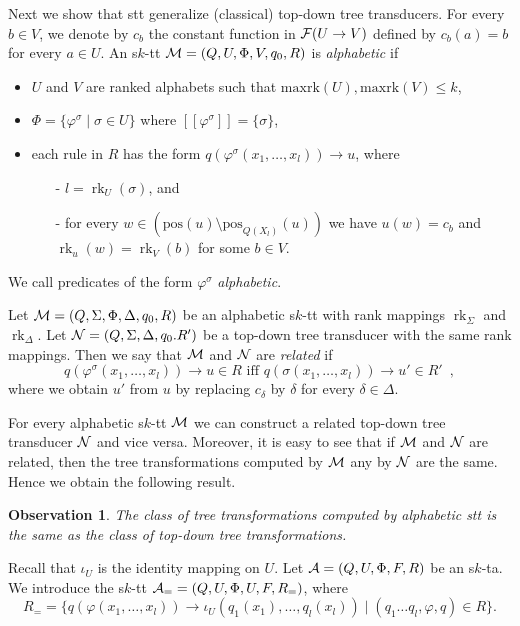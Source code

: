 \documentclass[10pt]{scrartcl}
\newtheorem{ob}[df]{Observation}
\newcommand{\seml}{[\![}
\newcommand{\semr}{]\!]}
\newcommand{\pos}{\mathrm{pos}}
\newcommand{\maxrk}{{\mathrm{maxrk}}}
\newcommand{\A}{{\cal A}}
\newcommand{\M}{{\cal M}}
\newcommand{\N}{{\cal N}}
\newcommand{\F}{{\cal F}}
\DeclareMathOperator{\rk}{rk}
\begin{document}
Next we show that stt generalize (classical) top-down tree transducers. For every $b\in V$, we denote
by $c_b$ the constant function in $\F(U \rightarrow V)$ defined by $c_b(a)=b$ for every $a\in U$.
An s$k$-tt  $\M = (Q,U,\Phi,V,q_0,R)$ is \emph{alphabetic} if 
\begin{itemize}
\item $U$ and $V$ are ranked alphabets such that $\maxrk(U), \maxrk(V)  \le k$,
\item $\Phi = \{\varphi^\sigma \mid \sigma \in U\}$ where $\seml \varphi^\sigma\semr = \{\sigma\}$,

\item each  rule in
  $R$ has the form $q(\varphi^\sigma(x_1,\ldots,x_l)){\rightarrow}u$, where
\begin{enumerate}
\item[-] $l = \rk_U(\sigma)$, and
\item[-] for every $w\in (\pos(u) \setminus \pos_{Q(X_l)}(u))$ we have $u(w)=c_b$  and $\rk_u(w)= \rk_V(b)$ for some $b\in V$.
\end{enumerate}
\end{itemize}
We call predicates of the form $\varphi^\sigma$ {\em alphabetic}.

Let $\M = (Q,\Sigma,\Phi,\Delta, q_0,R)$ be an alphabetic s$k$-tt with rank mappings $\rk_{\Sigma}$ and $\rk_{\Delta}$. Let $\N = (Q,\Sigma,\Delta,q_0.R')$ be a top-down tree transducer with the same rank mappings. Then we say that $\M$ and $\N$ are \emph{related} if 
\[
q(\varphi^\sigma(x_1,\ldots,x_l)) \to u \in R \text{ iff }  q(\sigma(x_1,\ldots,x_l)) \to u' \in R'\enspace,
\]
where we obtain $u'$ from $u$ by replacing $c_\delta$ by $\delta$ for every $\delta \in \Delta$.


For every alphabetic s$k$-tt $\M$ we can construct a related top-down tree transducer $\N$  and vice versa. Moreover, it is easy to see that if $\M$ and $\N$ are related, then the tree transformations computed by $\M$ any by $\N$ are the same. Hence we obtain the following result.


\begin{ob}\rm The class of tree transformations computed by alphabetic stt is the same as the class of top-down tree transformations.
\end{ob}




Recall that $\iota_U$ is the identity mapping on $U$. Let $\A = (Q,U,\Phi,F,R)$ be an s$k$-ta. We introduce the s$k$-tt $\A_{=} = (Q,U,\Phi,U,F,R_{=})$, where
$$ R_{=} = \{ q(\varphi(x_1,\ldots,x_l)){\rightarrow} \iota_U(q_1(x_{1}), \ldots, q_l(x_{l}))
\mid (q_1\ldots q_l,\varphi,q) \in R \}.$$
\end{document}
